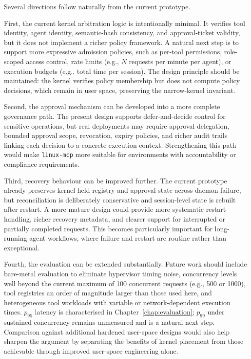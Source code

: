 Several directions follow naturally from the current prototype.

First, the current kernel arbitration logic is intentionally minimal.
It verifies tool identity, agent identity, semantic-hash consistency, and approval-ticket validity, but it does not implement a richer policy framework.
A natural next step is to support more expressive admission policies, such as per-tool permissions, role-scoped access control, rate limits (e.g., $N$ requests per minute per agent), or execution budgets (e.g., total time per session).
The design principle should be maintained: the kernel verifies policy membership but does not compute policy decisions, which remain in user space, preserving the narrow-kernel invariant.

Second, the approval mechanism can be developed into a more complete governance path. 
The present design supports defer-and-decide control for sensitive operations, but real deployments may require approval delegation, bounded approval scope, revocation, expiry policies, and richer audit trails linking each decision to a concrete execution context. 
Strengthening this path would make \texttt{linux-mcp} more suitable for environments with accountability or compliance requirements.

Third, recovery behaviour can be improved further. The current prototype already preserves kernel-held registry and approval state across daemon failure, but reconciliation is deliberately conservative and session-level state is rebuilt after restart. 
A more mature design could provide more systematic restart handling, richer recovery metadata, and clearer support for interrupted or partially completed requests.
This becomes particularly important for long-running agent workflows, where failure and restart are routine rather than exceptional.

Fourth, the evaluation can be extended substantially.
Future work should include bare-metal evaluation to eliminate hypervisor timing noise, concurrency levels well beyond the current maximum of 100 concurrent requests (e.g., 500 or 1000), tool registries an order of magnitude larger than those used here, and heterogeneous tool workloads with variable or network-dependent execution times.
$p_{95}$ latency is characterised in Chapter~\ref{chap:evaluation}; $p_{99}$ under sustained concurrency remains unmeasured and is a natural next step.
Comparison against additional hardened user-space designs would also help sharpen the argument by separating the benefits of kernel placement from those achievable through improved user-space engineering alone.

